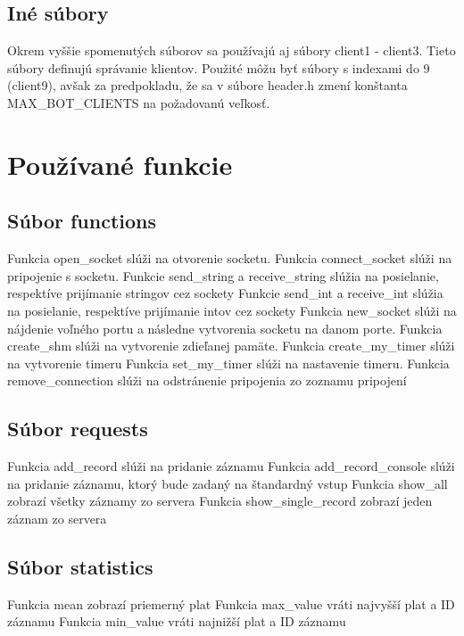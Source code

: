 \documentclass{article}
\begin{document}
\subsection{Iné súbory}
Okrem vyššie spomenutých súborov sa používajú aj súbory client1 - client3. Tieto súbory definujú
správanie klientov. Použité môžu byť súbory s indexami do 9 (client9), avšak za predpokladu, že sa
v súbore header.h zmení konštanta MAX\_BOT\_CLIENTS na požadovanú veľkosť.

\section{Používané funkcie}
\subsection{Súbor functions}
Funkcia open\_socket slúži na otvorenie socketu.
\newline
Funkcia connect\_socket slúži na pripojenie s socketu.
\newline
Funkcie send\_string a receive\_string slúžia na posielanie, respektíve prijímanie stringov cez
sockety
\newline
Funkcie send\_int a receive\_int slúžia na posielanie, respektíve prijímanie intov cez sockety
\newline
Funkcia new\_socket slúži na nájdenie voľného portu a následne vytvorenia socketu na danom porte.
\newline
Funkcia create\_shm slúži na vytvorenie zdieľanej pamäte.
\newline
Funkcia create\_my\_timer slúži na vytvorenie timeru
\newline
Funkcia set\_my\_timer slúži na nastavenie timeru.
\newline
Funkcia remove\_connection slúži na odstránenie pripojenia zo zoznamu pripojení

\subsection{Súbor requests}
Funkcia add\_record slúži na pridanie záznamu
\newline
Funkcia add\_record\_console slúži na pridanie záznamu, ktorý bude zadaný na štandardný vstup
\newline
Funkcia show\_all zobrazí všetky záznamy zo servera
\newline
Funkcia show\_single\_record zobrazí jeden záznam zo servera

\subsection{Súbor statistics}
Funkcia mean zobrazí priemerný plat
\newline
Funkcia max\_value vráti najvyšší plat a ID záznamu
\newline
Funkcia min\_value vráti najnižší plat a ID záznamu
\end{document}
